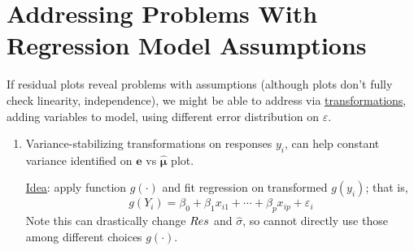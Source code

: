 \section{Addressing Problems With Regression Model Assumptions}

If residual plots reveal problems with assumptions
(although plots don't fully check linearity, independence),
we might be able to address via \underline{transformations},
adding variables to model, using different error
distribution on $ \varepsilon $.
\begin{enumerate}[label=(\arabic*)]
      \item Variance-stabilizing transformations on
            responses $ y_i $, can help constant variance identified
            on $ \symbf{e} $ vs $ \hat{\symbf{\mu}} $ plot.

            \underline{Idea}: apply function $ g(\cdot) $ and fit
            regression on transformed $ g(y_i) $; that is,
            \[ g(Y_i)=\beta_0+\beta_1x_{i1}+\cdots+\beta_p x_{ip}+\varepsilon_i \]
            Note this can drastically change $ \relax{Res} $
            and $ \hat{\sigma} $, so cannot directly use those among different
            choices $ g(\cdot) $.


\end{enumerate}
